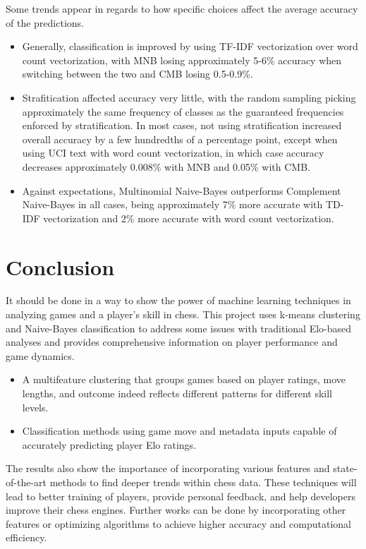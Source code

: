 \documentclass[conference]{IEEEtran}
\begin{document}
Some trends appear in regards to how specific choices affect the average accuracy of the predictions.
\begin{itemize}
\item Generally, classification is improved by using TF-IDF vectorization over word count vectorization, with MNB losing approximately 5-6\% accuracy when switching between the two and CMB losing 0.5-0.9\%.
\item Strafitication affected accuracy very little, with the random sampling picking approximately the same frequency of classes as the guaranteed frequencies enforced by stratification. In most cases, not using stratification increased overall accuracy by a few hundredths of a percentage point, except when using UCI text with word count vectorization, in which case accuracy decreases approximately 0.008\% with MNB and 0.05\% with CMB.
\item Against expectations, Multinomial Naive-Bayes outperforms Complement Naive-Bayes in all cases, being approximately 7\% more accurate with TD-IDF vectorization and 2\% more accurate with word count vectorization.
\end{itemize}

\section{Conclusion}

It should be done in a way to show the power of machine learning techniques in analyzing games and a player's skill in chess. This project uses k-means clustering and Naive-Bayes classification to address some issues with traditional Elo-based analyses and provides comprehensive information on player performance and game dynamics.

\begin{itemize}
    \item  A multifeature clustering that groups games based on player ratings, move lengths, and outcome indeed reflects different patterns for different skill levels.
    \item Classification methods using game move and metadata inputs capable of accurately predicting player Elo ratings.
\end{itemize}

The results also show the importance of incorporating various features and state-of-the-art methods to find deeper trends within chess data. These techniques will lead to better training of players, provide personal feedback, and help developers improve their chess engines. Further works can be done by incorporating other features or optimizing algorithms to achieve higher accuracy and computational efficiency.
\end{document}
